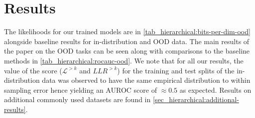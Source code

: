 {\section{Results}

The likelihoods for our trained models are in \cref{tab_hierarchical:bits-per-dim-ood} alongside baseline results for in-distribution and OOD data.
The main results of the paper on the OOD tasks can be seen along with comparisons to the baseline methods in \cref{tab_hierarchical:rocauc-ood}.
We note that for all our results, the value of the score ($\mathcal{L}^{>k}$ and $LLR^{>k}$) for the training and test splits of the in-distribution data was observed to have the same empirical distribution to within sampling error hence yielding an AUROC score of $\approx0.5$ as expected.
Results on additional commonly used datasets are found in \cref{sec_hierarchical:additional-results}.


}
